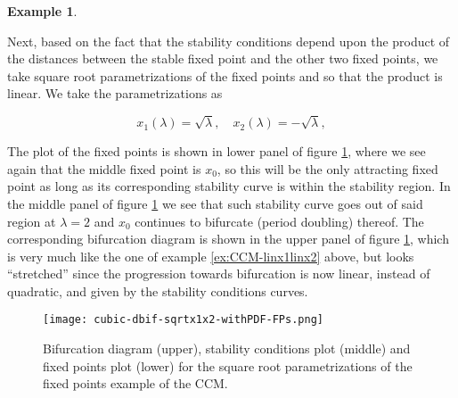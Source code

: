 \documentclass[10pt,twoside,titlepage]{book}
\numberwithin{equation}{chapter}
\numberwithin{figure}{chapter}
\numberwithin{table}{chapter}
\theoremstyle{plain}%
\theoremstyle{definition}
\newtheorem{example}{Example}[chapter]
\theoremstyle{remark}
\begin{document}
\begin{example}
	\label{ex:CCM-sqrtx1sqrtx2}
	
	Next, based on the fact that the stability conditions depend upon the product of the distances between the stable fixed point and the other two fixed points, we take square root parametrizations of the fixed points and so that the product is linear. We take the parametrizations as
	
	\begin{equation}
		x_1(\lambda)=\sqrt{\lambda},\quad x_2(\lambda)=-\sqrt{\lambda},
		\label{eq:CCM-sqrtx1sqrtx2}
	\end{equation}
	
	The plot of the fixed points is shown in lower panel of figure \ref{fig:CCM-sqrtx1sqrtx2}, where we see again that the middle fixed point is $x_0$, so this will be the only attracting fixed point as long as its corresponding stability curve is within the stability region. In the middle panel of figure \ref{fig:CCM-sqrtx1sqrtx2} we see that such stability curve goes out of said region at $\lambda=2$ and $x_0$ continues to bifurcate (period doubling) thereof. The corresponding bifurcation diagram is shown in the upper panel of figure \ref{fig:CCM-sqrtx1sqrtx2}, which is very much like the one of example \ref{ex:CCM-linx1linx2} above, but looks ``stretched'' since the progression towards bifurcation is now linear, instead of quadratic, and given by the stability conditions curves.
	
	\begin{figure}
		\centering
		\texttt{[image: cubic-dbif-sqrtx1x2-withPDF-FPs.png]}
		\caption{Bifurcation diagram (upper), stability conditions plot (middle) and fixed points plot (lower) for the square root parametrizations of the fixed points example of the CCM.}
		\label{fig:CCM-sqrtx1sqrtx2}
	\end{figure}
	
\end{example}

\FloatBarrier
\end{document}
